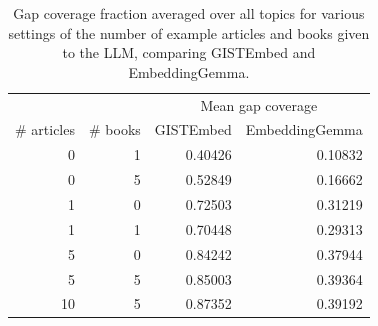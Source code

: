 \begin{table}
\caption{Gap coverage fraction averaged over all topics for various settings of the number of example articles and books given to the LLM, comparing GISTEmbed and EmbeddingGemma.}
\label{tab:triplet_gap_coverage_gap0}
\begin{tabular}{rrrr}
\toprule
\multicolumn{2}{c}{} & \multicolumn{2}{c}{Mean gap coverage} \\
\# articles & \# books & GISTEmbed & EmbeddingGemma \\
\midrule
0 & 1 & 0.40426 & 0.10832 \\
0 & 5 & 0.52849 & 0.16662 \\
1 & 0 & 0.72503 & 0.31219 \\
1 & 1 & 0.70448 & 0.29313 \\
5 & 0 & 0.84242 & 0.37944 \\
5 & 5 & 0.85003 & 0.39364 \\
10 & 5 & 0.87352 & 0.39192 \\
\bottomrule
\end{tabular}
\end{table}
